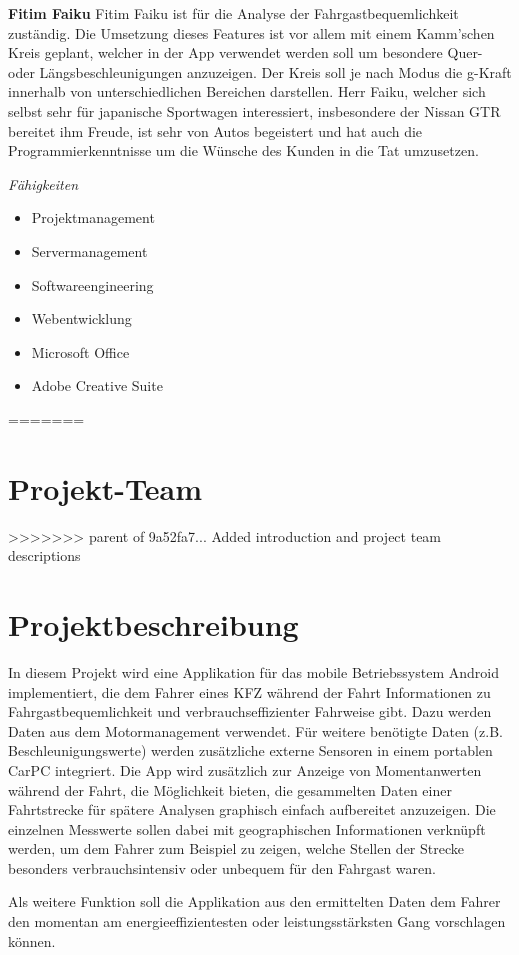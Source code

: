 \textbf{Fitim Faiku}
Fitim Faiku ist für die Analyse der Fahrgastbequemlichkeit zuständig. Die Umsetzung dieses Features ist vor allem mit einem Kamm'schen Kreis geplant, welcher in der App verwendet werden soll um besondere Quer- oder Längsbeschleunigungen anzuzeigen. Der Kreis soll je nach Modus die g-Kraft innerhalb von unterschiedlichen Bereichen darstellen. 
Herr Faiku, welcher sich selbst sehr für japanische Sportwagen interessiert, insbesondere der Nissan GTR bereitet ihm Freude, ist sehr von Autos begeistert und hat auch die Programmierkenntnisse um die Wünsche des Kunden in die Tat umzusetzen. 

\textit{Fähigkeiten}
\begin{itemize}
	\item Projektmanagement
	\item Servermanagement				
	\item Softwareengineering
	\item Webentwicklung
	\item Microsoft Office
	\item Adobe Creative Suite
\end{itemize}
=======

\section{Projekt-Team}
>>>>>>> parent of 9a52fa7... Added introduction and project team descriptions

\section{Projektbeschreibung}
In diesem Projekt wird eine Applikation für das mobile Betriebssystem Android implementiert, die dem Fahrer eines KFZ während der Fahrt Informationen zu Fahrgastbequemlichkeit und verbrauchseffizienter Fahrweise gibt. Dazu werden Daten aus dem Motormanagement verwendet. Für weitere benötigte Daten (z.B. Beschleunigungswerte) werden zusätzliche externe Sensoren in einem portablen CarPC integriert. Die App wird zusätzlich zur Anzeige von Momentanwerten während der Fahrt, die Möglichkeit bieten, die gesammelten Daten einer Fahrtstrecke für spätere Analysen graphisch einfach aufbereitet anzuzeigen. Die einzelnen Messwerte sollen dabei mit geographischen Informationen verknüpft werden, um dem Fahrer zum Beispiel zu zeigen, welche Stellen der Strecke besonders verbrauchsintensiv oder unbequem für den Fahrgast waren. 

Als weitere Funktion soll die Applikation aus den ermittelten Daten dem Fahrer den momentan am energieeffizientesten oder leistungsstärksten Gang vorschlagen können.
